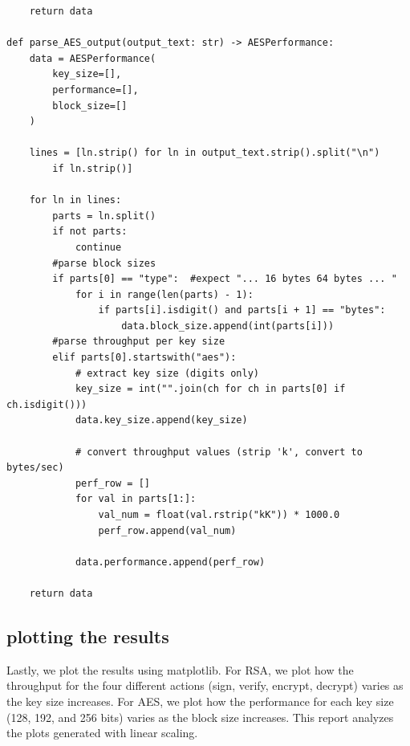\documentclass[11pt]{article}
\begin{document}
\begin{lstlisting}
    return data

def parse_AES_output(output_text: str) -> AESPerformance:
    data = AESPerformance(
        key_size=[],
        performance=[],
        block_size=[]
    )

    lines = [ln.strip() for ln in output_text.strip().split("\n")
		if ln.strip()]

    for ln in lines:
        parts = ln.split()
        if not parts:
            continue
        #parse block sizes
        if parts[0] == "type":  #expect "... 16 bytes 64 bytes ... "
            for i in range(len(parts) - 1):
                if parts[i].isdigit() and parts[i + 1] == "bytes":
                    data.block_size.append(int(parts[i]))
        #parse throughput per key size
        elif parts[0].startswith("aes"):
            # extract key size (digits only)
            key_size = int("".join(ch for ch in parts[0] if ch.isdigit()))
            data.key_size.append(key_size)

            # convert throughput values (strip 'k', convert to bytes/sec)
            perf_row = []
            for val in parts[1:]:
                val_num = float(val.rstrip("kK")) * 1000.0
                perf_row.append(val_num)

            data.performance.append(perf_row)

    return data
\end{lstlisting}

\subsection*{plotting the results}

Lastly, we plot the results using matplotlib. For RSA, we plot how the throughput for the four different actions (sign, verify, encrypt, decrypt) varies as the key size increases. For AES, we plot how the performance for each key size (128, 192, and 256 bits) varies as the block size increases. This report analyzes the plots generated with linear scaling.
\end{document}
